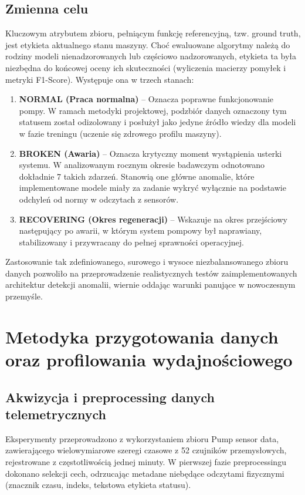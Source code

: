 \documentclass[12pt,twoside]{article}
\begin{document}
\subsection{Zmienna celu}
Kluczowym atrybutem zbioru, pełniącym funkcję referencyjną, tzw. ground truth, jest etykieta aktualnego stanu maszyny. Choć ewaluowane algorytmy należą do rodziny modeli nienadzorowanych lub częściowo nadzorowanych, etykieta ta była niezbędna do końcowej oceny ich skuteczności (wyliczenia macierzy pomyłek i metryki F1-Score). Występuje ona w trzech stanach:
\begin{enumerate}[label=\alph*), leftmargin=1.25cm] 
	\item \textbf{NORMAL (Praca normalna)} -- Oznacza poprawne funkcjonowanie pompy. W ramach metodyki projektowej, podzbiór danych oznaczony tym statusem został odizolowany i posłużył jako jedyne źródło wiedzy dla modeli w fazie treningu (uczenie się zdrowego profilu maszyny).
	\item \textbf{BROKEN (Awaria)} -- Oznacza krytyczny moment wystąpienia usterki systemu. W analizowanym rocznym okresie badawczym odnotowano dokładnie 7 takich zdarzeń. Stanowią one główne anomalie, które implementowane modele miały za zadanie wykryć wyłącznie na podstawie odchyleń od normy w odczytach z sensorów.
	\item \textbf{RECOVERING (Okres regeneracji)} -- Wskazuje na okres przejściowy następujący po awarii, w którym system pompowy był naprawiany, stabilizowany i przywracany do pełnej sprawności operacyjnej.
\end{enumerate}
Zastosowanie tak zdefiniowanego, surowego i wysoce niezbalansowanego zbioru danych pozwoliło na przeprowadzenie realistycznych testów zaimplementowanych architektur detekcji anomalii, wiernie oddając warunki panujące w nowoczesnym przemyśle.

\section{Metodyka przygotowania danych oraz profilowania wydajnościowego}
\subsection{Akwizycja i preprocessing danych telemetrycznych}
Eksperymenty przeprowadzono z wykorzystaniem zbioru Pump sensor data, zawierającego wielowymiarowe szeregi czasowe z 52 czujników przemysłowych, rejestrowane z częstotliwością jednej minuty. W pierwszej fazie preprocessingu dokonano selekcji cech, odrzucając metadane niebędące odczytami fizycznymi (znacznik czasu, indeks, tekstowa etykieta statusu).
\end{document}
